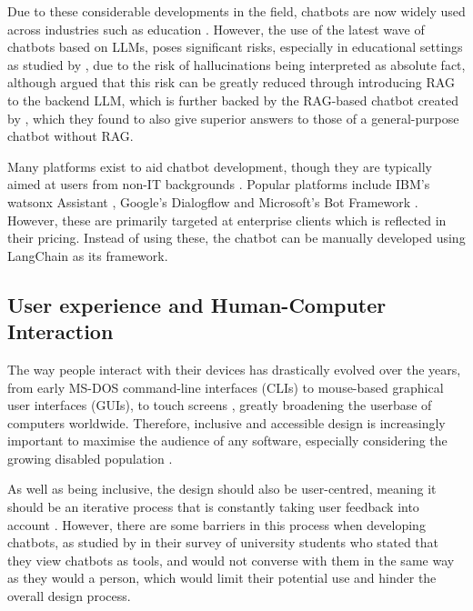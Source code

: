 \documentclass[12pt]{report}
\begin{document}
    Due to these considerable developments in the field, chatbots are now widely used 
    across industries such as education \autocite{kuhail_interacting_2023}. However, the use of the latest wave of chatbots based on LLMs,
    poses significant risks, especially in educational settings as studied by \textcite{neumann_llm-driven_2024},
    due to the risk of hallucinations being interpreted as absolute fact, although \textcite{shuster_retrieval_2021} 
    argued that this risk can be greatly reduced through introducing RAG to the backend LLM, which is further backed 
    by the RAG-based chatbot created by \textcite{ge_development_2023}, which they found to also give superior answers
    to those of a general-purpose chatbot without RAG.  


    Many platforms exist to aid chatbot development, though they are typically aimed at users from non-IT backgrounds 
    \autocite{srivastava_desirable_2020}. Popular platforms include IBM's watsonx Assistant \autocite{ibm_ibm_2024},
    Google's Dialogflow \autocite{google_conversational_nodate} and Microsoft's Bot Framework \autocite{microsoft_microsoft_nodate}.
    However, these are primarily targeted at enterprise clients which is reflected in their pricing. Instead of using these,
    the chatbot can be manually developed using LangChain as its framework.

    \pagebreak 

    \subsection{User experience and Human-Computer Interaction}

    The way people interact with their devices has drastically evolved over the years, from early MS-DOS command-line 
    interfaces (CLIs) to mouse-based graphical user interfaces (GUIs), to touch screens \autocite{kotian_systematic_2024}, greatly broadening
    the userbase of computers worldwide. Therefore, inclusive and accessible design is increasingly important to maximise the audience of any software,
    especially considering the growing disabled population \autocite{putnam_how_2012}. 
    
    As well as being inclusive, the design 
    should also be user-centred, meaning it should be an iterative process that is constantly taking user feedback 
    into account \autocite{chammas_closer_2015}. However, there are some barriers in this process when developing 
    chatbots, as studied by \textcite{clark_what_2019} in their survey of university students who stated that they view 
    chatbots as tools, and would not converse with them in the same way as they would a person, which would 
    limit their potential use and hinder the overall design process. 
\end{document}
